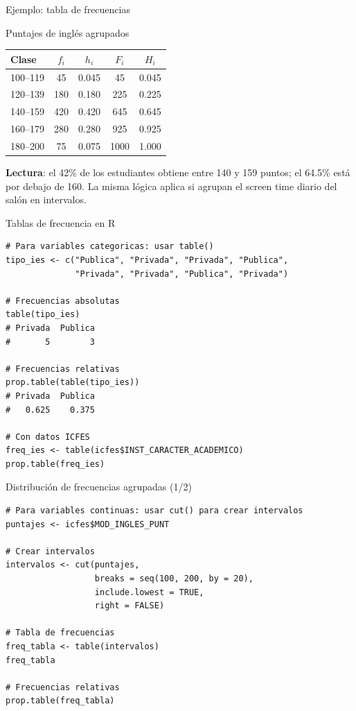 \documentclass[aspectratio=169, 11pt]{beamer}
\begin{document}
\begin{frame}{Ejemplo: tabla de frecuencias}
\begin{exampleblock}{Puntajes de inglés agrupados}
\centering
\small
\begin{tabular}{lcccc}
\toprule
Clase & $f_i$ & $h_i$ & $F_i$ & $H_i$ \\
\midrule
100--119 & 45 & 0.045 & 45 & 0.045 \\
120--139 & 180 & 0.180 & 225 & 0.225 \\
140--159 & 420 & 0.420 & 645 & 0.645 \\
160--179 & 280 & 0.280 & 925 & 0.925 \\
180--200 & 75 & 0.075 & 1000 & 1.000 \\
\bottomrule
\end{tabular}
\end{exampleblock}

\textbf{Lectura}: el 42\% de los estudiantes obtiene entre 140 y 159 puntos; el 64.5\% est\'a por debajo de 160. La misma l\'ogica aplica si agrupan el screen time diario del sal\'on en intervalos.
\end{frame}

\begin{frame}[fragile]{Tablas de frecuencia en R}
\begin{lstlisting}
# Para variables categoricas: usar table()
tipo_ies <- c("Publica", "Privada", "Privada", "Publica",
              "Privada", "Privada", "Publica", "Privada")

# Frecuencias absolutas
table(tipo_ies)
# Privada  Publica
#       5        3

# Frecuencias relativas
prop.table(table(tipo_ies))
# Privada  Publica
#   0.625    0.375

# Con datos ICFES
freq_ies <- table(icfes$INST_CARACTER_ACADEMICO)
prop.table(freq_ies)
\end{lstlisting}
\end{frame}

\begin{frame}[fragile]{Distribución de frecuencias agrupadas (1/2)}
\begin{lstlisting}
# Para variables continuas: usar cut() para crear intervalos
puntajes <- icfes$MOD_INGLES_PUNT

# Crear intervalos
intervalos <- cut(puntajes,
                  breaks = seq(100, 200, by = 20),
                  include.lowest = TRUE,
                  right = FALSE)

# Tabla de frecuencias
freq_tabla <- table(intervalos)
freq_tabla

# Frecuencias relativas
prop.table(freq_tabla)
\end{lstlisting}
\end{frame}
\end{document}
